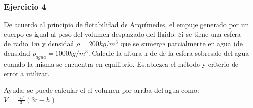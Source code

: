 \documentclass[a4paper,11pt]{article}
\theoremstyle{mytheor}
\begin{document}
\subsubsection*{Ejercicio 4}

De acuerdo al principio de flotabilidad de Arquímedes, el empuje generado por un cuerpo es igual al peso del volumen desplazado del fluido. Si se tiene una esfera de radio $1m$ y densidad $\rho = 200kg/m^3$ que se sumerge parcialmente en agua (de densidad $\rho_{agua}=1000kg/m^3$. Calcule la altura h de de la esfera sobresale del agua  cuando la misma se encuentra en equilibrio. Establezca el método y criterio de error a utilizar.

Ayuda: se puede calcular el el volumen por arriba del agua como:
$V = \frac{\pi h^2}{3} (3r-h)$
\end{document}
